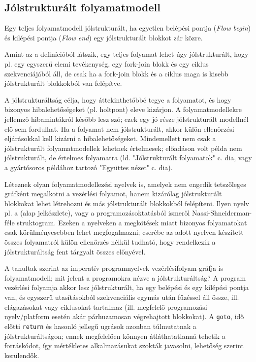 \subsection{Jólstrukturált folyamatmodell}

Egy teljes folyamatmodell jólstrukturált, ha egyetlen belépési pontja (\emph{Flow begin}) és kilépési pontja (\emph{Flow end}) egy jólstrukturált blokkot zár közre.

Amint az a definícióból látszik, egy teljes folyamat lehet úgy jólstrukturált, hogy pl. egy egyszerű elemi tevékenység, egy fork-join blokk és egy ciklus szekvenciájából áll, de csak ha a fork-join blokk és a ciklus maga is kisebb jólstrukturált blokkokból van felépítve.

A jólstrukturáltság célja, hogy áttekinthetőbbé tegye a folyamatot, és hogy bizonyos hibalehetőségeket (pl. holtpont) eleve kizárjon. A folyamatmodellekre jellemző hibamintákról később lesz szó; ezek egy jó része jólstrukturált modellnél elő sem fordulhat. Ha a folyamat nem jólstrukturált, akkor külön ellenőrzési eljárásokkal kell kizárni a hibalehetőségeket. Mindemellett nem csak a jólstrukturált folyamatmodellek lehetnek értelmesek; előadáson volt példa nem jólstrukturált, de értelmes folyamatra (ld. "Jólstrukturált folyamatok" c. dia, vagy a gyártósoros példához tartozó "Együttes nézet" c. dia).

Léteznek olyan folyamatmodellezési nyelvek is, amelyek nem engedik tetszőleges gráfként megalkotni a vezérlési folyamot, hanem kizárólag jólstrukturált blokkokat lehet létrehozni és más jólstrukturált blokkokból felépíteni. Ilyen nyelv pl. a  (alap jelkészlete), vagy a programozásoktatásból ismeről Nassi-Shneiderman-féle struktogram. Ezeken a nyelveken a megkötések miatt bizonyos folyamatokat csak körülményesebben lehet megfogalmazni; cserébe az adott nyelven készített összes folyamatról külön ellenőrzés nélkül tudható, hogy rendelkezik a jólstrukturáltság fent tárgyalt összes előnyével.

A tanultak szerint az imperatív programnyelvek vezérlésifolyam-gráfja is folyamatmodell; mit jelent a programokra nézve a jólstrukturáltság? A program vezérlési folyamja akkor lesz jólstrukturált, ha egy belépési és egy kilépési pontja van, és egyszerű utasításokból szekvenciális egymás után fűzéssel áll össze, ill. elágazásokat vagy ciklusokat tartalmaz (ill. megfelelő programozási nyelv/platform esetén akár párhuzamosan végrehajtott blokkokat). A \lstinline{goto}, idő előtti \lstinline{return} és hasonló jellegű ugrások azonban túlmutatnak a jólstrukturáltságon; ennek megfelelően könnyen átláthatatlanná tehetik a forráskódot, így mértékletes alkalmazásukat szokták javasolni, lehetőség szerint kerülendők.
